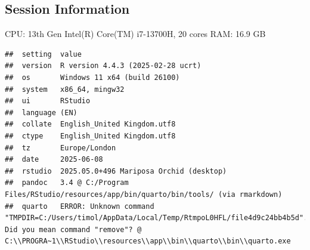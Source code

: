 \documentclass[
]{article}
\begin{document}
\subsection{Session Information}\label{Session_Information}

CPU: 13th Gen Intel(R) Core(TM) i7-13700H, 20 cores \newline
RAM: 16.9 GB

\begin{verbatim}
##  setting  value
##  version  R version 4.4.3 (2025-02-28 ucrt)
##  os       Windows 11 x64 (build 26100)
##  system   x86_64, mingw32
##  ui       RStudio
##  language (EN)
##  collate  English_United Kingdom.utf8
##  ctype    English_United Kingdom.utf8
##  tz       Europe/London
##  date     2025-06-08
##  rstudio  2025.05.0+496 Mariposa Orchid (desktop)
##  pandoc   3.4 @ C:/Program Files/RStudio/resources/app/bin/quarto/bin/tools/ (via rmarkdown)
##  quarto   ERROR: Unknown command "TMPDIR=C:/Users/timol/AppData/Local/Temp/RtmpoL0HFL/file4d9c24bb4b5d". Did you mean command "remove"? @ C:\\PROGRA~1\\RStudio\\resources\\app\\bin\\quarto\\bin\\quarto.exe
\end{verbatim}
\end{document}

